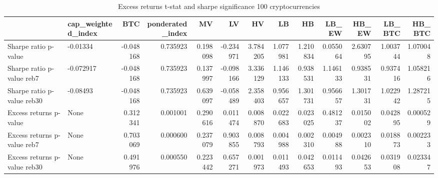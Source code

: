 \begin{table}
\centering
\caption{Excess returns t-stat and sharpe significance 100 cryptocurrencies}
\label{signif100_30}
\begin{tabular}{llrrrrrrrrrrr}
\toprule
{} & cap\_weighted\_index &       BTC &  ponderated\_index &        MV &        LV &        HV &        LB &        HB &     LB\_EW &     HB\_EW &    LB\_BTC &    HB\_BTC \\
\midrule
Sharpe ratio p-value         &           -0.01334 & -0.048168 &          0.735923 &  0.198098 & -0.234971 &  3.784205 &  1.077981 &  1.210834 &  0.055064 &  2.630795 &  1.003744 &  1.070048 \\
Sharpe ratio p-value reb7    &          -0.072917 & -0.048168 &          0.735923 &  0.137997 & -0.098166 &  3.336129 &  1.146133 &  0.938531 &  1.146133 &  0.938531 &  0.937416 &  1.058216 \\
Sharpe ratio p-value reb30   &           -0.08493 & -0.048168 &          0.735923 &  0.639097 & -0.058489 &  2.358403 &  0.956657 &  1.301731 &  0.956657 &  1.301731 &  1.022942 &  1.287215 \\
Excess returns p-value       &               None &  0.312341 &          0.001001 &  0.290616 &  0.011474 &  0.008870 &  0.022683 &  0.023025 &  0.481237 &  0.015002 &  0.042895 &  0.000529 \\
Excess returns p-value reb7  &               None &  0.703069 &          0.000600 &  0.237079 &  0.903855 &  0.008793 &  0.004988 &  0.002310 &  0.004988 &  0.002310 &  0.018873 &  0.002233 \\
Excess returns p-value reb30 &               None &  0.491976 &          0.000550 &  0.223442 &  0.657271 &  0.001973 &  0.011493 &  0.042653 &  0.011493 &  0.042653 &  0.031908 &  0.023347 \\
\bottomrule
\end{tabular}
\end{table}
